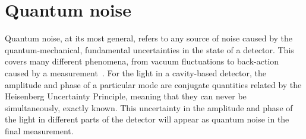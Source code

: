 \section{Quantum noise}
\label{sec:qnoise}

Quantum noise, at its most general, refers to any source of noise caused by the quantum-mechanical, fundamental uncertainties in the state of a detector. This covers many different phenomena, from vacuum fluctuations to back-action caused by a measurement~\cite{}. For the light in a cavity-based detector, the amplitude and phase of a particular mode are conjugate quantities related by the Heisenberg Uncertainty Principle, meaning that they can never be simultaneously, exactly known. This uncertainty in the amplitude and phase of the light in different parts of the detector will appear as quantum noise in the final measurement. %

